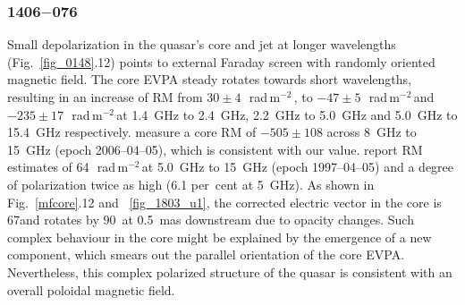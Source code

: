 \documentclass[a4paper,fleqn,usenatbib,useAMS]{mnras}
\newcommand{\rmu}{\,rad\,m$^{-2}$\,} %
\begin{document}
\subsubsection{1406$-$076}
Small depolarization in the quasar's core and jet at longer wavelengths (Fig.~\ref{fig_0148}.12) points to external Faraday screen with randomly oriented magnetic field. 
The core EVPA steady rotates towards short wavelengths, resulting in an increase of RM from $30\pm4$~\rmu, to $-47\pm5$~\rmu and $-235\pm17$~\rmu at 1.4~GHz to 2.4~GHz, 2.2~GHz to 5.0~GHz and 5.0~GHz to 15.4~GHz respectively.
\citet{hovatta_etal12} measure a core RM of $-505\pm108$ across 8~GHz to 15~GHz (epoch 2006--04--05), which is consistent with our value.
\citet{2011ARep...55..400V} report RM estimates of 64~\rmu at 5.0~GHz to 15~GHz (epoch 1997--04--05) and a degree of polarization twice as high (6.1 per~cent at 5~GHz). 
As shown in Fig.~\ref{mfcore}.12 and ~\ref{fig_1803_u1}, the corrected electric vector in the core is 67\degr and rotates by 90\degr\ at 0.5~mas downstream due to opacity changes.
Such complex behaviour in the core might be explained by the emergence of a new component, which smears out the parallel orientation of the core EVPA. 
Nevertheless, this complex polarized structure of the quasar is consistent with an overall poloidal magnetic field.
\end{document}
